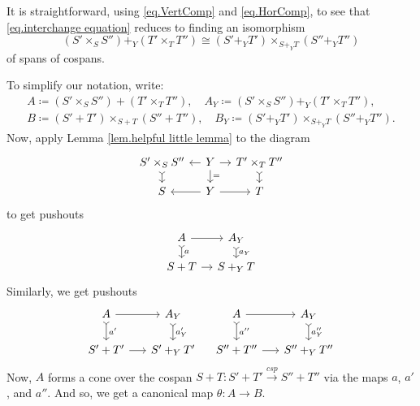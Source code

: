 \documentclass[11pt]{amsart}
\newcommand{\from}{\colon}
\newcommand{\cospan}{\xrightarrow{\mathit{csp}}}
\theoremstyle{remark}
\theoremstyle{definition}
\begin{document}
It is straightforward, using \eqref{eq.VertComp} and \eqref{eq.HorComp}, to see that \eqref{eq.interchange equation} reduces to finding an isomorphism
%
\begin{equation}
\label{eq.interchange simplified}
	(S' \times_S S'') +_Y (T' \times_T T'')
	\cong
	(S' +_Y T') \times_{S+_YT} (S'' +_Y T'')
\end{equation}
of spans of cospans.

%
%
%
%
%

To simplify our notation, write:
%
\begin{gather*}
A \coloneqq (S' \times_SS'') + (T' \times_TT''), \quad 
A_Y \coloneqq (S' \times_SS'') +_Y (T' \times_TT''),\\
B \coloneqq (S'+T') \times_{S+T} (S''+T''),  \quad  
B_Y \coloneqq (S'+_YT') \times_{S+_YT} (S''+_YT''). 
\end{gather*}
Now, apply Lemma \ref{lem.helpful little lemma} to the diagram
\[
\begin{tikzcd}[column sep=1.0em,row sep=1.0em]
	{S' \times_S S''}
		\ar[d,rightarrowtail] &
	{Y} 
		\ar[d,"="] 
		\ar[r] 
		\ar[l] &
	{T' \times_T T''} 
		\ar[d,rightarrowtail] \\
	{S} &
	{Y} 
		\ar[r] 
		\ar[l] &
	{T} 
\end{tikzcd}
\]
to get pushouts
\[
\begin{tikzcd}[column sep=1.0em,row sep=1em]
	{A} 
		\ar[r]
		\ar[d,rightarrowtail,"a"] & 
	{A_Y} 
		\ar[d,rightarrowtail,"a_Y"] \\
	{S+T} 
		\ar[r] & 
	{S+_YT}
\end{tikzcd}
\]
Similarly, we get pushouts
\[
\begin{tikzcd}[column sep=1.5em,row sep=1.5em]
	{A} 
		\ar[r]
		\ar[d,rightarrowtail,"a'"] & 
	{A_Y} 
		\ar[d,rightarrowtail,"a_Y'"] \\
	{S'+T'} 
		\ar[r] & 
	{S'+_YT'}
\end{tikzcd}
\quad
\begin{tikzcd}[column sep=1.5em,row sep=1.5em]
	{A} 
		\ar[r]
		\ar[d,rightarrowtail,"a''"] & 
	{A_Y} 
		\ar[d,rightarrowtail,"a_Y''"] \\
	{S''+T''} 
		\ar[r] & 
	{S''+_YT''}
\end{tikzcd}
\]
Now, $A$  forms a cone over the cospan $S+T \from S'+T' \cospan S'' + T''$ via the maps $a$, $a'$, and $a''$. And so, we get a canonical map $\theta \from A \to B$.  
%
%
%
%
%
%
\end{document}
